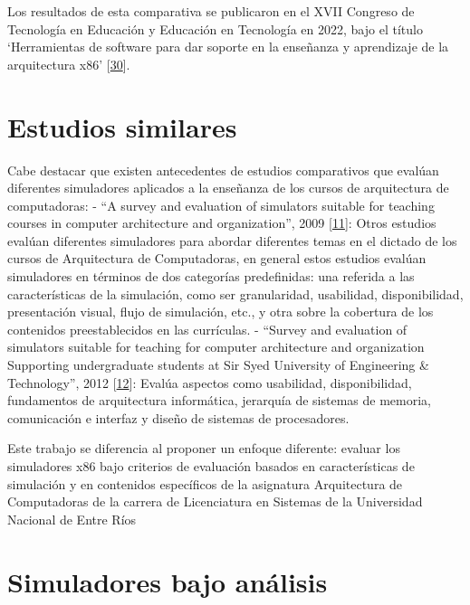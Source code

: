 \documentclass[12pt,twoside]{templates/unerthesis}
\begin{document}
Los resultados de esta comparativa se publicaron en el XVII Congreso de Tecnología en Educación y Educación en Tecnología en 2022, bajo el título `Herramientas de software para dar soporte en la enseñanza y aprendizaje de la arquitectura x86' {[}\protect\hyperlink{ref-colombani_herramientas_2022}{30}{]}.

\hypertarget{estudios-similares}{%
\section{Estudios similares}\label{estudios-similares}}

Cabe destacar que existen antecedentes de estudios comparativos que evalúan diferentes simuladores aplicados a la enseñanza de los cursos de arquitectura de computadoras:
- ``A survey and evaluation of simulators suitable for teaching courses in computer architecture and organization'', 2009 {[}\protect\hyperlink{ref-nikolic_survey_2009}{11}{]}: Otros estudios evalúan diferentes simuladores para abordar diferentes temas en el dictado de los cursos de Arquitectura de Computadoras, en general estos estudios evalúan simuladores en términos de dos categorías predefinidas: una referida a las características de la simulación, como ser granularidad, usabilidad, disponibilidad, presentación visual, flujo de simulación, etc., y otra sobre la cobertura de los contenidos preestablecidos en las currículas.
- ``Survey and evaluation of simulators suitable for teaching for computer architecture and organization Supporting undergraduate students at Sir Syed University of Engineering \& Technology'', 2012 {[}\protect\hyperlink{ref-hasan_survey_2012}{12}{]}: Evalúa aspectos como usabilidad, disponibilidad, fundamentos de arquitectura informática, jerarquía de sistemas de memoria, comunicación e interfaz y diseño de sistemas de procesadores.

Este trabajo se diferencia al proponer un enfoque diferente: evaluar los simuladores x86 bajo criterios de evaluación basados en características de simulación y en contenidos específicos de la asignatura Arquitectura de Computadoras de la carrera de Licenciatura en Sistemas de la Universidad Nacional de Entre Ríos

\hypertarget{simuladores-bajo-anuxe1lisis}{%
\section{Simuladores bajo análisis}\label{simuladores-bajo-anuxe1lisis}}
\end{document}
